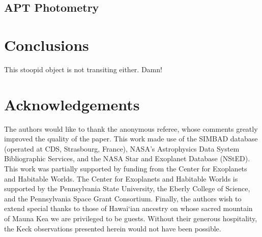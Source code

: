 \documentclass[12pt,preprint]{emulateapj}
\begin{document}
\subsection{APT Photometry}

\section{Conclusions}

This stoopid object is not transiting either. Damn!


\section*{Acknowledgements}

The authors would like to thank the anonymous referee, whose comments
greatly improved the quality of the paper. This work made use of the
SIMBAD database (operated at CDS, Strasbourg, France), NASA's
Astrophysics Data System Bibliographic Services, and the NASA Star and
Exoplanet Database (NStED). This work was partially supported by
funding from the Center for Exoplanets and Habitable Worlds. The
Center for Exoplanets and Habitable Worlds is supported by the
Pennsylvania State University, the Eberly College of Science, and the
Pennsylvania Space Grant Consortium. Finally, the authors wish to
extend special thanks to those of Hawai`ian ancestry on whose sacred
mountain of Mauna Kea we are privileged to be guests. Without their
generous hospitality, the Keck observations presented herein would not
have been possible.

\end{document}
